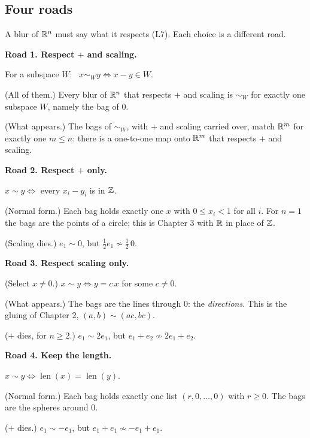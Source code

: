 \subsection*{Four roads}

A blur of $\mathbb{R}^n$ must say what it respects (L7). Each choice is a different road.

\textbf{Road 1. Respect $+$ and scaling.}
\begin{lines}
\item[\lab{B1}] For a subspace $W$: \ $x \sim_W y \iff x - y \in W$.
\item[\lab{P8}] (All of them.) Every blur of $\mathbb{R}^n$ that respects $+$ and scaling is $\sim_W$ for exactly one subspace $W$, namely the bag of $0$.
\item[\lab{P9}] (What appears.) The bags of $\sim_W$, with $+$ and scaling carried over, match $\mathbb{R}^m$ for exactly one $m \le n$: there is a one-to-one map onto $\mathbb{R}^m$ that respects $+$ and scaling.
\end{lines}

\textbf{Road 2. Respect $+$ only.}
\begin{lines}
\item[\lab{B2}] $x \sim y \iff$ every $x_i - y_i$ is in $\mathbb{Z}$.
\item[\lab{P10}] (Normal form.) Each bag holds exactly one $x$ with $0 \le x_i < 1$ for all $i$. For $n = 1$ the bags are the points of a circle; this is Chapter 3 with $\mathbb{R}$ in place of $\mathbb{Z}$.
\item[\lab{P11}] (Scaling dies.) $e_1 \sim 0$, but $\tfrac12 e_1 \not\sim \tfrac12\, 0$.
\end{lines}

\textbf{Road 3. Respect scaling only.}
\begin{lines}
\item[\lab{B3}] (Select $x \neq 0$.) $x \sim y \iff y = c\,x$ for some $c \neq 0$.
\item[\lab{P12}] (What appears.) The bags are the lines through $0$: the \emph{directions}. This is the gluing of Chapter 2, $(a,b) \sim (ac, bc)$.
\item[\lab{P13}] ($+$ dies, for $n \ge 2$.) $e_1 \sim 2 e_1$, but $e_1 + e_2 \not\sim 2 e_1 + e_2$.
\end{lines}

\textbf{Road 4. Keep the length.}
\begin{lines}
\item[\lab{B4}] $x \sim y \iff \operatorname{len}(x) = \operatorname{len}(y)$.
\item[\lab{P14}] (Normal form.) Each bag holds exactly one list $(r, 0, \dots, 0)$ with $r \ge 0$. The bags are the spheres around $0$.
\item[\lab{P15}] ($+$ dies.) $e_1 \sim -e_1$, but $e_1 + e_1 \not\sim -e_1 + e_1$.
\end{lines}

